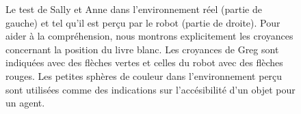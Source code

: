 \documentclass[a4paper,11pt,twoside]{StyleThese}
\begin{document}
\begin{figure}[ht!]
  \begin{center}
 \end{center}
  \caption{Le test de Sally et Anne dans l'environnement réel (partie de gauche) et tel qu'il est perçu par le robot (partie de droite). Pour aider à la compréhension, nous montrons explicitement les croyances concernant la position du livre blanc. Les croyances de Greg sont indiquées avec des flèches vertes et celles du robot avec des flèches rouges.
Les petites sphères de couleur dans l'environnement perçu sont utilisées comme des indications sur l'accésibilité d'un objet pour un agent.}
  \label{SA}
\end{figure}
\end{document}

